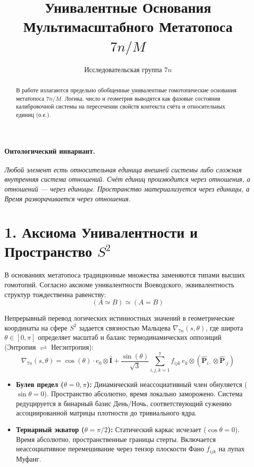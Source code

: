 \documentclass[10pt,twocolumn]{article}
\begin{document}
\title{\tiny\bf Унивалентные Основания Мультимасштабного Метатопоса $7n/M$}
\author{\tiny Исследовательская группа $7n$}
\date{\vspace{-9ex}}
\maketitle

\begin{abstract}
\tiny
В работе излагаются предельно обобщенные унивалентные гомотопические основания метатопоса $7n/M$. Логика, число и геометрия выводятся как фазовые состояния калибровочной системы на пересечении свойств контекста счёта и относительных единиц (о.е.).
\end{abstract}

\paragraph{Онтологический инвариант.} 
\textit{Любой элемент есть относительная единица внешней системы либо сложная внутренняя система отношений. Счёт единиц производится через отношения, а отношений — через единицы. Пространство материализуется через единицы, а Время разворачивается через отношения.}

\section*{1. Аксиома Унивалентности и Пространство $S^2$}
В основаниях метатопоса традиционные множества заменяются типами высших гомотопий. Согласно аксиоме унивалентности Воеводского, эквивалентность структур тождественна равенству:
\begin{equation}
(A \simeq B) \simeq (A = B)
\end{equation}

Непрерывный перевод логических истинностных значений в геометрические координаты на сфере $S^2$ задается связностью Мальцева $\nabla_{7n}(s, \theta)$, где широта $\theta \in [0, \pi]$ определяет масштаб и баланс термодинамических оппозиций (Энтропия $\rightleftharpoons$ Негэнтропия):
\begin{equation}
\nabla_{7n}(s, \theta) = \cos(\theta) \cdot e_0 \otimes \mathbf{\hat{\mathbf{I}}} + \frac{\sin(\theta)}{\sqrt{3}} \sum_{i,j,k=1}^{7} f_{ijk} \, e_k \otimes \left( \mathbf{\hat{\mathbf{P}}}_{i \cdot} \otimes \mathbf{\hat{\mathbf{P}}}_{\cdot j} \right)
\end{equation}

\begin{itemize}
    \item \textbf{Булев предел ($\theta = 0, \pi$):} Динамический неассоциативный член обнуляется ($\sin\theta = 0$). Пространство абсолютно, время локально заморожено. Система редуцируется в бинарный базис День/Ночь, соответствующий сужению ассоциированной матрицы плотности до тривиального ядра.
    \item \textbf{Тернарный экватор ($\theta = \pi/2$):} Статический каркас исчезает ($\cos\theta = 0$). Время абсолютно, пространственные границы стерты. Включается неассоциативное перемешивание через тензор плоскости Фано $f_{ijk}$ на лупах Муфанг.
\end{itemize}
\end{document}
